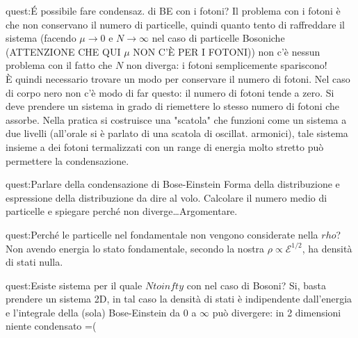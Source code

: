 \begin{quest}{quest:É possibile fare condensaz. di BE con i fotoni?}
    Il problema con i fotoni è che non conservano il numero di particelle, quindi quanto tento di raffreddare il sistema (facendo $\mu\to 0$ e $N\to \infty$ nel caso di particelle Bosoniche (ATTENZIONE CHE QUI $\mu$ NON C'È PER I FOTONI)) non c'è nessun problema con il fatto che $N$ non diverga: i fotoni semplicemente spariscono!\\
    È quindi necessario trovare un modo per conservare il numero di fotoni. Nel caso di corpo nero non c'è modo di far questo: il numero di fotoni tende a zero. 
    Si deve prendere un sistema in grado di riemettere lo stesso numero di fotoni che assorbe. Nella pratica si costruisce una "scatola" che funzioni come un sistema a due livelli (all'orale si è parlato di una scatola di oscillat. armonici), tale sistema insieme a dei fotoni termalizzati con un range di energia molto stretto può permettere la condensazione.
\end{quest}
\begin{quest}{quest:Parlare della condensazione di Bose-Einstein}
Forma della distribuzione e espressione della distribuzione da dire al volo. Calcolare il numero medio di particelle e spiegare perché non diverge\ldots Argomentare.
\end{quest}
\begin{quest}{quest:Perché le particelle nel fondamentale non vengono considerate nella $rho$?}
Non avendo energia lo stato fondamentale, secondo la nostra $\rho \propto  \mathcal{E}^{1 /2}$, ha densità di stati nulla.
\end{quest}
\begin{quest}{quest:Esiste sistema per il quale $Ntoinfty$ con  nel caso di Bosoni?}
    Si, basta prendere un sistema 2D, in tal caso la densità di stati è indipendente dall'energia e l'integrale della (sola) Bose-Einstein da 0 a $\infty$ può divergere: in 2 dimensioni niente condensato =(
\end{quest}

